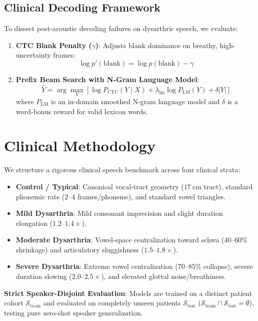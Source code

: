 \documentclass[10pt,twocolumn]{article}
\begin{document}
\subsection{Clinical Decoding Framework}

To dissect post-acoustic decoding failures on dysarthric speech, we evaluate:
\begin{enumerate}
    \item \textbf{CTC Blank Penalty ($\gamma$)}: Adjusts blank dominance on breathy, high-uncertainty frames:
    \begin{equation}
        \log p'(\text{blank}) = \log p(\text{blank}) - \gamma
    \end{equation}
    \item \textbf{Prefix Beam Search with N-Gram Language Model}:
    \begin{equation}
        \hat{Y} = \arg\max_Y \left[ \log P_{\text{CTC}}(Y \mid X) + \lambda_{\text{lm}} \log P_{\text{LM}}(Y) + \delta |Y| \right]
    \end{equation}
    where $P_{\text{LM}}$ is an in-domain smoothed N-gram language model and $\delta$ is a word-bonus reward for valid lexicon words.
\end{enumerate}

\section{Clinical Methodology}

We structure a rigorous clinical speech benchmark across four clinical strata:
\begin{itemize}
    \item \textbf{Control / Typical}: Canonical vocal-tract geometry ($17~\text{cm}$ tract), standard phonemic rate ($2$--$4$ frames/phoneme), and standard vowel triangles.
    \item \textbf{Mild Dysarthria}: Mild consonant imprecision and slight duration elongation ($1.2$--$1.4\times$).
    \item \textbf{Moderate Dysarthria}: Vowel-space centralization toward schwa ($40$--$60\%$ shrinkage) and articulatory sluggishness ($1.5$--$1.8\times$).
    \item \textbf{Severe Dysarthria}: Extreme vowel centralization ($70$--$85\%$ collapse), severe duration slowing ($2.0$--$2.5\times$), and elevated glottal noise/breathiness.
\end{itemize}

\noindent\textbf{Strict Speaker-Disjoint Evaluation}: Models are trained on a distinct patient cohort $\mathcal{S}_{\text{train}}$ and evaluated on completely unseen patients $\mathcal{S}_{\text{test}}$ ($\mathcal{S}_{\text{train}} \cap \mathcal{S}_{\text{test}} = \emptyset$), testing pure zero-shot speaker generalization.
\end{document}
